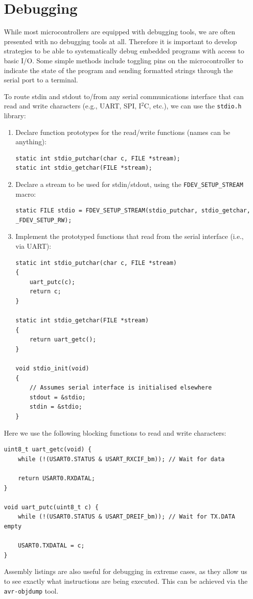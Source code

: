 \documentclass[a4paper]{report}
\begin{document}
\section{Debugging}
While most microcontrollers are equipped with debugging tools, we are often presented with
no debugging tools at all. Therefore it is important to develop strategies to be able to
systematically debug embedded programs with access to basic I/O.
Some simple methods include toggling pins on the microcontroller to indicate the state of the program
and sending formatted strings through the serial port to a terminal.

To route stdin and stdout to/from any serial communications interface that can read and write characters
(e.g., UART, SPI, I\({}^2\)C, etc.), we can use the \texttt{stdio.h} library:
\begin{enumerate}
    \item Declare function prototypes for the read/write functions (names can be anything):
    \begin{verbatim}
static int stdio_putchar(char c, FILE *stream);
static int stdio_getchar(FILE *stream);
    \end{verbatim}
    \item Declare a stream to be used for stdin/stdout, using the \texttt{FDEV_SETUP_STREAM} macro:
    \begin{verbatim}
static FILE stdio = FDEV_SETUP_STREAM(stdio_putchar, stdio_getchar, _FDEV_SETUP_RW);
    \end{verbatim}
    \item Implement the prototyped functions that read from the serial interface (i.e., via UART):
    \begin{verbatim}
static int stdio_putchar(char c, FILE *stream)
{
    uart_putc(c);
    return c;
}

static int stdio_getchar(FILE *stream)
{
    return uart_getc();
}

void stdio_init(void)
{
    // Assumes serial interface is initialised elsewhere
    stdout = &stdio;
    stdin = &stdio;
}
    \end{verbatim}
\end{enumerate}
Here we use the following blocking functions to read and write characters:
\begin{verbatim}
uint8_t uart_getc(void) {
    while (!(USART0.STATUS & USART_RXCIF_bm)); // Wait for data

    return USART0.RXDATAL;
}

void uart_putc(uint8_t c) {
    while (!(USART0.STATUS & USART_DREIF_bm)); // Wait for TX.DATA empty

    USART0.TXDATAL = c;
}
\end{verbatim}
Assembly listings are also useful for debugging in extreme cases, as they
allow us to see exactly what instructions are being executed. This can be achieved via the
\texttt{avr-objdump} tool.
\end{document}
